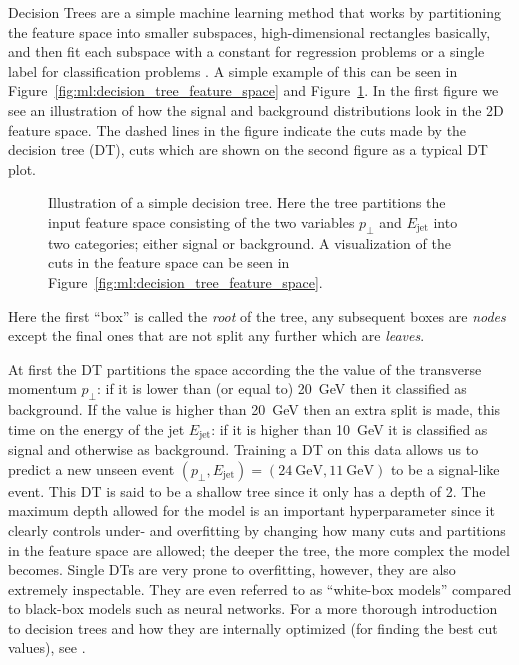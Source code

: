 \documentclass[a4paper, twoside, nobib]{tufte-book}
\newcommand{\q}[1]{``#1''}
\begin{document}
Decision Trees are a simple machine learning method that works by partitioning the feature space into smaller subspaces, high-dimensional rectangles basically, and then fit each subspace with a constant for regression problems or a single label for classification problems \citep{hastieElementsStatisticalLearning2009}. A simple example of this can be seen in Figure~\ref{fig:ml:decision_tree_feature_space} and Figure~\ref{fig:ml:decision_tree}. In the first figure we see an illustration of how the signal and background distributions look in the 2D feature space. The dashed lines in the figure indicate the cuts made by the decision tree (DT), cuts which are shown on the second figure as a typical DT plot. 
\begin{figure}
  \centering
  \caption[Decision Tree]{
    Illustration of a simple decision tree. Here the tree partitions the input feature space consisting of the two variables $p_\perp$ and $E_\mathrm{jet}$ into two categories; either signal or background. A visualization of the cuts in the feature space can be seen in Figure~\ref{fig:ml:decision_tree_feature_space}.
  }
  \label{fig:ml:decision_tree}
\end{figure}
Here the first \q{box} is called the \emph{root} of the tree, any subsequent boxes are \emph{nodes} except the final ones that are not split any further which are \emph{leaves}.

At first the DT partitions the space according the the value of the transverse momentum $p_\perp$: if it is lower than (or equal to) \SI{20}{\GeV} then it classified as background. If the value is higher than \SI{20}{\GeV} then an extra split is made, this time on the energy of the jet $E_\mathrm{jet}$: if it is higher than \SI{10}{\GeV} it is classified as signal and otherwise as background. Training a DT on this data allows us to predict a new unseen event $(p_\perp, E_\mathrm{jet}) = (\SI{24}{\GeV},\SI{11}{\GeV})$ to be a signal-like event. This DT is said to be a shallow tree since it only has a depth of \num{2}. The maximum depth allowed for the model is an important hyperparameter since it clearly controls under- and overfitting by changing how many cuts and partitions in the feature space are allowed; the deeper the tree, the more complex the model becomes. Single DTs are very prone to overfitting, however, they are also extremely inspectable. They are even referred to as \q{white-box models} compared to black-box models such as neural networks. For a more thorough introduction to decision trees and how they are internally optimized (for finding the best cut values), see \citet{hastieElementsStatisticalLearning2009}. 
\end{document}
